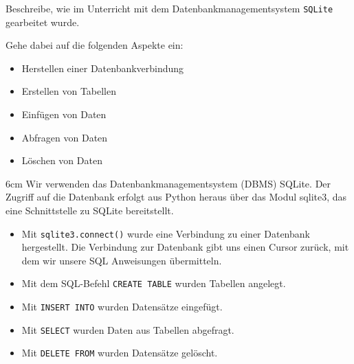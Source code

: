 \question[3]
Beschreibe, wie im Unterricht mit dem Datenbankmanagementsystem \texttt{SQLite} gearbeitet wurde.

Gehe dabei auf die folgenden Aspekte ein:

\begin{itemize}
\item Herstellen einer Datenbankverbindung
\item Erstellen von Tabellen
\item Einfügen von Daten
\item Abfragen von Daten
\item Löschen von Daten
\end{itemize}

\begin{solutionbox}{6cm}
Wir verwenden das Datenbankmanagementsystem (DBMS) SQLite. Der Zugriff auf die Datenbank erfolgt aus Python heraus über das Modul sqlite3, das eine Schnittstelle zu SQLite bereitstellt.

\begin{itemize}
\item Mit \texttt{sqlite3.connect()} wurde eine Verbindung zu einer Datenbank hergestellt.
Die Verbindung zur Datenbank gibt uns einen Cursor zurück, mit dem wir unsere SQL Anweisungen
 übermitteln.
\item Mit dem SQL-Befehl \texttt{CREATE TABLE} wurden Tabellen angelegt.
\item Mit \texttt{INSERT INTO} wurden Datensätze eingefügt.
\item Mit \texttt{SELECT} wurden Daten aus Tabellen abgefragt.
\item Mit \texttt{DELETE FROM} wurden Datensätze gelöscht.
\end{itemize}
\end{solutionbox}